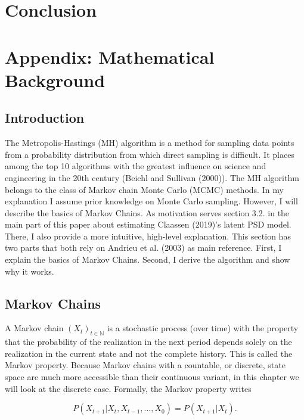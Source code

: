 \documentclass[12pt,english,a4paper,oneside]{article}
\theoremstyle{definition}
\theoremstyle{definition}
\theoremstyle{definition}
\theoremstyle{definition}
\theoremstyle{remark}
\begin{document}
\hypertarget{conclusion}{%
\section{Conclusion}\label{conclusion}}

\hypertarget{appendix-mathematical-background}{%
\section{Appendix: Mathematical Background}\label{appendix-mathematical-background}}

\hypertarget{introduction-1}{%
\subsection{Introduction}\label{introduction-1}}

The Metropolis-Hastings (MH) algorithm is a method for sampling data points from a probability distribution from which direct sampling is difficult. It places among the top 10 algorithms with the greatest influence on science and engineering in the 20th century (Beichl and Sullivan (2000)). The MH algorithm belongs to the class of Markov chain Monte Carlo (MCMC) methods. In my explanation I assume prior knowledge on Monte Carlo sampling. However, I will describe the basics of Markov Chains. As motivation serves section 3.2. in the main part of this paper about estimating Claassen (2019)'s latent PSD model. There, I also provide a more intuitive, high-level explanation. This section has two parts that both rely on Andrieu et al. (2003) as main reference. First, I explain the basics of Markov Chains. Second, I derive the algorithm and show why it works.

\hypertarget{markov-chains}{%
\subsection{Markov Chains}\label{markov-chains}}

A Markov chain \((X_t)_{t \in \mathbb{N}}\) is a stochastic process (over time) with the property that the probability of the realization in the next period depends solely on the realization in the current state and not the complete history. This is called the Markov property. Because Markov chains with a countable, or discrete, state space are much more accessible than their continuous variant, in this chapter we will look at the discrete case. Formally, the Markov property writes

\begin{equation}
\label{eq:markov-property}
P(X_{t+1} |X_{t}, X_{t-1}, ..., X_{0}) = P(X_{t+1} |X_{t}).
\end{equation}
\end{document}
